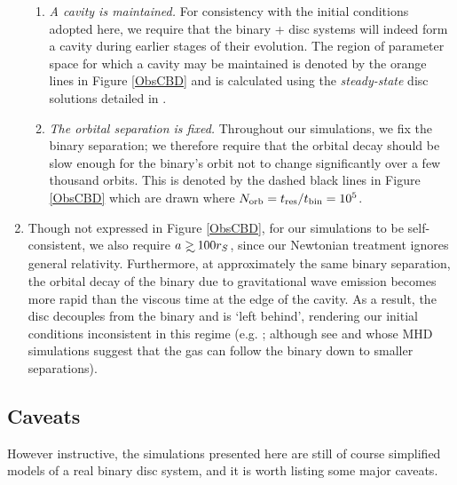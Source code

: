 \begin{enumerate}
{\begin{enumerate}
{		desirable since it increases the probability of finding such a system; however, 
		longer residence times occur at larger separations and longer orbital times, 
		which will make it more difficult to verify any periodic behavior.}
%
		\item {\textit{A cavity is maintained.} For consistency with the initial conditions 
		adopted here, we require that the binary + disc systems
		will indeed form a cavity during earlier stages of
		their evolution. The region of parameter space for which a cavity 
		may be maintained is denoted by the orange lines in Figure \ref{ObsCBD} 
		and is calculated using the {\em steady-state} disc solutions detailed 
		in \cite{Kocsis+2012b}. }
%
		\item{\textit{The orbital separation is fixed.} Throughout our simulations, we fix the binary separation; we
		therefore require that the orbital decay should be slow enough for the
		binary's orbit not to change significantly over a few thousand
		orbits. This is denoted by the dashed black lines in Figure \ref{ObsCBD} 
		which are drawn where $N_{\rm orb} = t_{\rm res}/t_{\rm bin} =10^5$.} 
%
	\end{enumerate}  }
%
	\item{Though not expressed in Figure \ref{ObsCBD}, for our simulations to be self-consistent, we also require $a\gsim 100
	r_S$, since our Newtonian treatment ignores general relativity.
	Furthermore, at approximately the same binary separation, the orbital
	decay of the binary due to gravitational wave emission becomes more
	rapid than the viscous time at the edge of the cavity. As a result,
	the disc decouples from the binary and is `left behind', rendering our
	initial conditions inconsistent in this regime
	(e.g. \citealt{Milos:Phinney:2005}; although see
	\citealt{FarrisGold:2012} and \citealt{Noble+2012} whose MHD
	simulations suggest that the gas can follow the binary down to smaller
	separations).}
\end{enumerate}


\subsection{Caveats}
\label{Caveats}

However instructive, the simulations presented here are still of
course simplified models of a real binary disc system, and it is worth
listing some major caveats.

